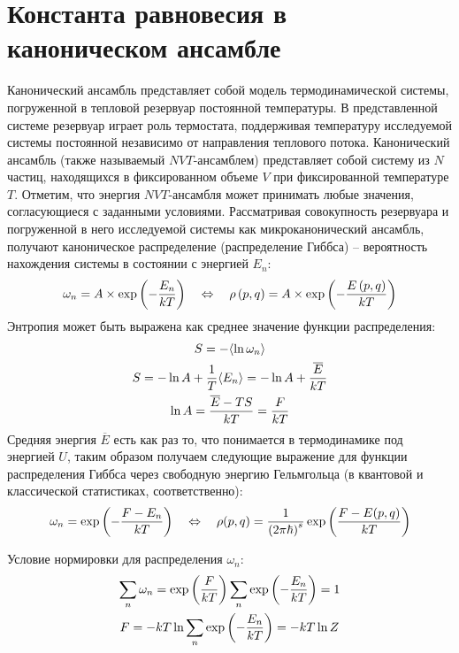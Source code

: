 \section{Константа равновесия в каноническом ансамбле}

Канонический ансамбль представляет собой модель термодинамической системы, погруженной в тепловой резервуар постоянной температуры. В представленной системе резервуар играет роль термостата, поддерживая температуру исследуемой системы постоянной независимо от направления теплового потока. Канонический ансамбль (также называемый $NVT$-ансамблем) представляет собой систему из $N$ частиц, находящихся в фиксированном объеме $V$ при фиксированной температуре $T$. Отметим, что энергия $NVT$-ансамбля может принимать любые значения, согласующиеся с заданными условиями. Рассматривая совокупность резервуара и погруженной в него исследуемой системы как микроканонический ансамбль, получают каноническое распределение (распределение Гиббса) -- вероятность нахождения системы в состоянии с энергией $E_n$:
\vverh
\begin{gather}
	\omega_n = A \times \exp \left( - \frac{E_n}{kT} \right) \quad \Leftrightarrow \quad \rho \left( p, q \right) = A \times \exp \left( - \frac{E \left( p, q \right)}{kT} \right) \notag
\end{gather}
Энтропия может быть выражена как среднее значение функции распределения:
\vverh
\begin{gather}
	S = - \langle \ln \omega_n \rangle \notag \\
	S = - \ln A + \frac{1}{T} \langle E_n \rangle = - \ln A + \frac{\overline{E}}{kT} \notag \\
	\ln A = \frac{\overline{E} - TS}{kT} = \frac{F}{kT} \notag 
\end{gather}
Средняя энергия $\overline{E}$ есть как раз то, что понимается в термодинамике под энергией $U$, таким образом получаем следующие выражение для функции распределения Гиббса через свободную энергию Гельмгольца (в квантовой и классической статистиках, соответственно):
\vverh
\begin{gather}
	\omega_n = \exp \left( - \frac{F - E_n}{kT} \right) \quad \Leftrightarrow \quad \rho(p, q) = \frac{1}{\left( 2 \pi \hbar \right)^{s}} \exp \left( \frac{F - E(p, q)}{kT} \right) \notag
\end{gather}

Условие нормировки для распределения $\omega_n$:
\vverh
\begin{gather}
	\sum_n \omega_n = \exp \left( \frac{F}{kT} \right) \sum_n \exp \left( - \frac{E_n}{kT} \right) = 1 \notag \\
	F = - kT \ln \sum_n \exp \left( - \frac{E_n}{kT} \right) = - kT \ln Z \notag
\end{gather}

